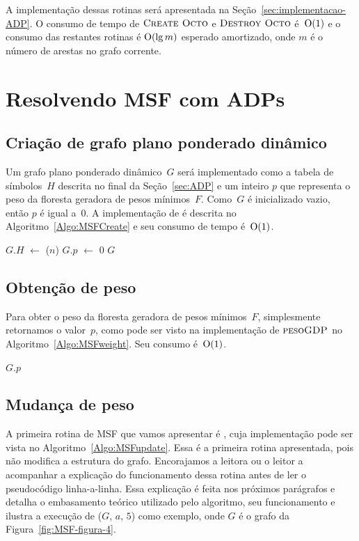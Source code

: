 A implementação dessas rotinas será apresentada na Seção~\ref{sec:implementacao-ADP}.
O consumo de tempo de $\text{\scshape Create Octo}$ e $\text{\scshape Destroy Octo}$ é~$\mathrm{O}(1)$ e o consumo das restantes rotinas é $\mathrm{O}(\lg m)$ esperado amortizado, onde $m$ é o número de arestas no grafo corrente.

\section{Resolvendo MSF com ADPs}
\label{sec:MSFcomADPs}

\subsection{Criação de grafo plano ponderado dinâmico}

Um grafo plano ponderado dinâmico~$G$ será implementado como a tabela de símbolos~$H$ descrita no final da Seção~\ref{sec:ADP} e um inteiro $p$ que representa o peso da floresta geradora de pesos mínimos~$F$.
Como~$G$ é inicializado vazio, então $p$ é igual a~$0$.
A implementação de \MSFCreate{} é descrita no Algoritmo~\ref{Algo:MSFCreate} e seu consumo de tempo é~$\mathrm{O}(1)$.

\begin{algorithm}[htb]
\caption{\MSFCreate($n$)}
\label{Algo:MSFCreate}
\begin{algorithmic}[1]
\State $G.H$ $\gets$ \hashCreate($n$)
\State $G.p$ $\gets$ $0$
\State \Return $G$
\end{algorithmic}
\end{algorithm}

\subsection{Obtenção de peso}

Para obter o peso da floresta geradora de pesos mínimos~$F$, simplesmente retornamos o valor~$p$, como pode ser visto na implementação de $\text{\scshape pesoGDP}$ no Algoritmo~\ref{Algo:MSFweight}.
Seu consumo é~$\mathrm{O}(1)$.
\begin{algorithm}[htb]
\caption{\MSFweight($G$)}
\label{Algo:MSFweight}
\begin{algorithmic}[1]
\State \Return $G$.$p$
\end{algorithmic}
\end{algorithm}

\subsection{Mudança de peso}
A primeira rotina de MSF que vamos apresentar é \MSFupdate{}, cuja implementação pode ser vista no Algoritmo~\ref{Algo:MSFupdate}.
Essa é a primeira rotina apresentada, pois não modifica a estrutura do grafo.
Encorajamos a leitora ou o leitor a acompanhar a explicação do funcionamento dessa rotina antes de ler o pseudocódigo linha-a-linha.
Essa explicação é feita nos próximos parágrafos e detalha o embasamento teórico utilizado pelo algoritmo, seu funcionamento e ilustra a execução de \MSFupdate($G$, $a$, $5$) como exemplo, onde $G$ é o grafo da Figura~\ref{fig:MSF-figura-4}.


